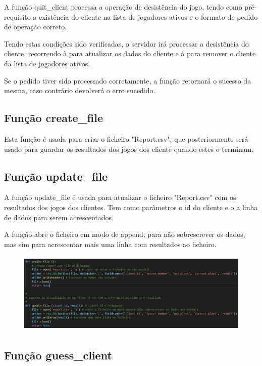 \documentclass{report}
\begin{document}
A função quit\_client processa a operação de desistência do jogo, tendo como pré-requisito a existência do cliente na lista de jogadores ativos e o formato de pedido de operação correto.

Tendo estas condições sido verificadas, o servidor irá processar a desistência do cliente, recorrendo à  para atualizar os dados do cliente e à  para remover o cliente da lista de jogadores ativos.

Se o pedido tiver sido processado corretamente, a função retornará o sucesso da mesma, caso contrário devolverá o erro sucedido.

\subsection{Função create\_file}
\label{ssec:func_create_file}

Esta função é usada para criar o ficheiro "Report.csv", que posteriormente será usado para guardar os resultados dos jogos dos cliente quando estes o terminam.

\subsection{Função update\_file}
\label{ssec:func_update_file}

A função update\_file é usada para atualizar o ficheiro "Report.csv" com os resultados dos jogos dos clientes. Tem como parâmetros o id do cliente e o a linha de dados para serem acrescentados.

A função abre o ficheiro em modo de append, para não sobrescrever os dados, mas sim para acrescentar mais uma linha com resultados ao ficheiro.

\begin{figure}[!h]
\center
\includegraphics[height = 110pt]{img/createupdate.png}
\end{figure}

\subsection{Função guess\_client}
\label{ssec:func_guess_client}
\end{document}
